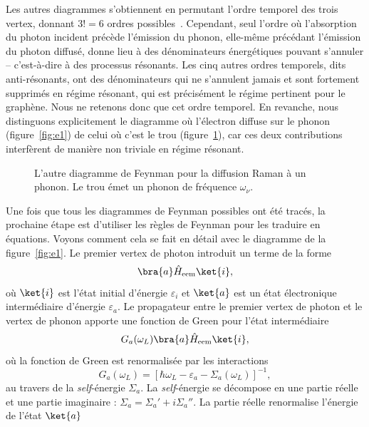 Les autres diagrammes s'obtiennent en permutant l'ordre temporel des trois vertex, donnant $3!=6$ ordres possibles~\cite{yuFundamentalsSemiconductorsPhysics2010}. Cependant, seul l'ordre où l'absorption du photon incident précède l'émission du phonon, elle-même précédant l'émission du photon diffusé, donne lieu à des dénominateurs énergétiques pouvant s'annuler -- c'est-à-dire à des processus résonants. Les cinq autres ordres temporels, dits anti-résonants, ont des dénominateurs qui ne s'annulent jamais et sont fortement supprimés en régime résonant, qui est précisément le régime pertinent pour le graphène. Nous ne retenons donc que cet ordre temporel. En revanche, nous distinguons explicitement le diagramme où l'électron diffuse sur le phonon (figure~\ref{fig:e1}) de celui où c'est le trou (figure~\ref{fig:h1}), car ces deux contributions interfèrent de manière non triviale en régime résonant.
\begin{figure}[htbp]
    \centering
    
    \caption[L'autre diagramme de Feynman pour la diffusion Raman à un phonon.]{L'autre diagramme de Feynman pour la diffusion Raman à un phonon. Le trou émet un phonon de fréquence $\omega_\nu$.}
    \label{fig:h1}
\end{figure}
Une fois que tous les diagrammes de Feynman possibles ont été tracés, la prochaine étape est d'utiliser les règles de Feynman pour les traduire en équations. Voyons comment cela se fait en détail avec le diagramme de la figure~\ref{fig:e1}. Le premier vertex de photon introduit un terme de la forme
\begin{equation}
    \bra{a}\hat{H}_\text{eem}\ket{i},
\end{equation}
où $\ket{i}$ est l'état initial d'énergie $\varepsilon_i$ et $\ket{a}$ est un état électronique intermédiaire d'énergie $\varepsilon_a$. Le propagateur entre le premier vertex de photon et le vertex de phonon apporte une fonction de Green pour l'état intermédiaire
\begin{equation}
     G_a(\omega_L)\bra{a}\hat{H}_\text{eem}\ket{i},
\end{equation}
où la fonction de Green est renormalisée par les interactions
\begin{equation}
    G_a(\omega_L) = \left[\hbar\omega_L-\varepsilon_a -\Sigma_a(\omega_L)\right]^{-1},
\end{equation}
au travers de la \textit{self}-énergie $\Sigma_a$. La \textit{self}-énergie se décompose en une partie réelle et une partie imaginaire : $\Sigma_a = \Sigma_a' + i \Sigma_a''$. La partie réelle renormalise l'énergie de l'état $\ket{a}$
